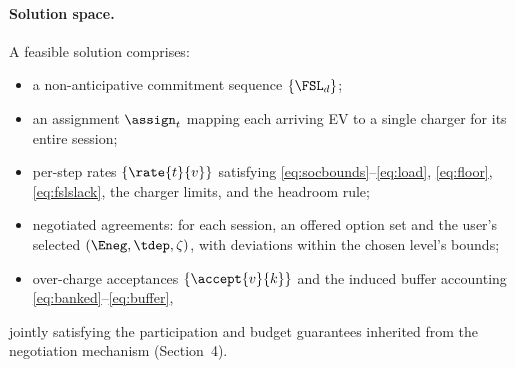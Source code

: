 \paragraph{Solution space.} A feasible solution comprises:
\begin{itemize}
\item a non-anticipative commitment sequence $\{\FSL_d\}$;
\item an assignment $\assign_t$ mapping each arriving EV to a single
charger for its entire session;
\item per-step rates $\{\rate{t}{v}\}$ satisfying
\eqref{eq:socbounds}--\eqref{eq:load}, \eqref{eq:floor},
\eqref{eq:fslslack}, the charger limits, and the headroom rule;
\item negotiated agreements: for each session, an offered option set and
the user's selected $(\Eneg, \tdep, \zeta)$, with deviations within the
chosen level's bounds;
\item over-charge acceptances $\{\accept{v}{k}\}$ and the induced buffer
accounting \eqref{eq:banked}--\eqref{eq:buffer},
\end{itemize}
jointly satisfying the participation and budget guarantees inherited
from the negotiation mechanism (Section~4).